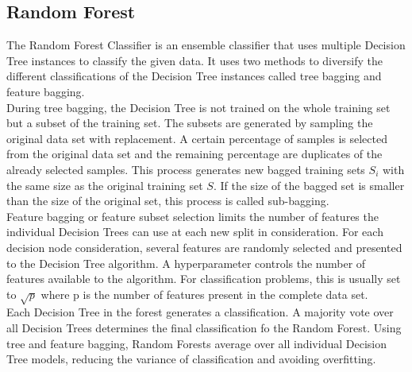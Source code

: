 \subsection{Random Forest}
The Random Forest Classifier is an ensemble classifier that uses multiple 
Decision Tree instances to classify the given data. It uses two methods to 
diversify the different classifications of the Decision Tree instances called 
tree bagging and feature bagging.\cite{RN163}
\\
During tree bagging, the Decision Tree is not trained on the whole training 
set but a subset of the training set. The subsets are generated by sampling 
the original data set with replacement. A certain percentage of samples 
is selected from the original data set and the remaining 
percentage are duplicates of the already selected samples. This 
process generates new bagged training sets $S_i$ with the same size as the 
original training set $S$. If the size of the bagged set is smaller than the 
size of the original set, this process is called sub-bagging.\cite{RN175}
\\
Feature bagging or feature subset selection limits the number of features the 
individual Decision Trees can use at each new split in consideration. 
For each decision node consideration, several features are randomly 
selected and presented to the Decision Tree algorithm. A hyperparameter 
controls the number of features available to the algorithm. For 
classification problems, this is usually set to $\sqrt{p}$ where p is the 
number of features present in the complete data set.
\\
Each Decision Tree in the forest generates a classification. A majority vote 
over all Decision Trees determines the final classification fo the Random 
Forest. Using tree and feature bagging, Random Forests average over 
all individual Decision Tree models, reducing the variance of 
classification and avoiding overfitting.\cite{RN166}
